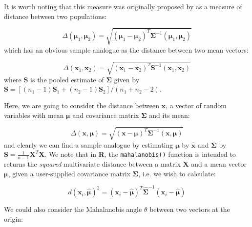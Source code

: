 It is worth noting that this measure was originally proposed by
\cite{Mahalanobis:1930} as a measure of distance between two populations:

\begin{displaymath}
\Delta(\boldsymbol{\mu}_{1},\boldsymbol{\mu}_{2}) = \sqrt{(\boldsymbol{\mu}_{1} - \boldsymbol{\mu}_{2})^{T}\boldsymbol{\Sigma}^{-1}(\boldsymbol{\mu}_{1},\boldsymbol{\mu}_{2}) }
\end{displaymath}
which has an obvious sample analogue as the distance between two mean vectors:

\begin{displaymath}
\Delta(\boldsymbol{\bar{x}}_{1},\boldsymbol{\bar{x}}_{2}) = \sqrt{(\boldsymbol{\bar{x}}_{1} - \boldsymbol{\bar{x}}_{2})^{T}\boldsymbol{S}^{-1}(\boldsymbol{\bar{x}}_{1},\boldsymbol{\bar{x}}_{2}) }
\end{displaymath}
where $\boldsymbol{S}$ is the pooled estimate of $\boldsymbol{\Sigma}$ given by $\boldsymbol{S} = \left[ (n_{1}-1) \boldsymbol{S}_{1} +  (n_{2}-1) \boldsymbol{S}_{2} \right] / (n_{1} + n_{2} - 2)$.

Here, we are going to consider the distance between $\boldsymbol{x}$, a vector of random variables with mean $\boldsymbol{\mu}$ and covariance matrix $\boldsymbol{\Sigma}$ and its mean:

\begin{displaymath}
\Delta(\boldsymbol{x},\boldsymbol{\mu}) = \sqrt{(\boldsymbol{x} - \boldsymbol{\mu})^{T}\boldsymbol{\Sigma}^{-1}(\boldsymbol{x},\boldsymbol{\mu}) }
\end{displaymath}
and clearly we can find a sample analogue by estimating $\boldsymbol{\mu}$ by $\hat{\boldsymbol{x}}$ and $\boldsymbol{\Sigma}$ by $\boldsymbol{S} = \frac{1}{n-1} \boldsymbol{X}^{T}\boldsymbol{X}$.  We note that in \textbf{R}, the \verb+mahalanobis()+ function is intended to returns the \emph{squared} multivariate distance between a matrix $\boldsymbol{X}$ and a mean vector $\boldsymbol{\mu}$, given a user-supplied covariance matrix $\boldsymbol{\Sigma}$, i.e. we wish to calculate: 

\begin{displaymath}
d(\boldsymbol{x}_{i},\hat{\boldsymbol{\mu}})^{2} 
= (\boldsymbol{x}_{i} - \hat{\boldsymbol{\mu}})^{T}
\hat{\boldsymbol{\Sigma}}^{-1}
(\boldsymbol{x}_{i} - \hat{\boldsymbol{\mu}}) 
\end{displaymath}

We could also consider the Mahalanobis angle $\theta$ between two vectors at the origin:

